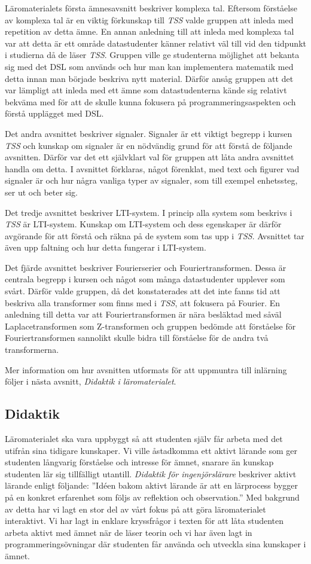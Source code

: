\documentclass[]{article}
\begin{document}
Läromaterialets första ämnesavsnitt beskriver komplexa tal. Eftersom förståelse av komplexa tal är en viktig förkunskap
till \textit{TSS} valde gruppen att inleda med repetition av detta ämne. En annan anledning till att inleda med komplexa
tal var att detta är ett område datastudenter känner relativt väl till vid den tidpunkt i studierna då de läser
\textit{TSS}. Gruppen ville ge studenterna möjlighet att bekanta sig med det DSL som används och hur man kan
implementera matematik med detta innan man började beskriva nytt material. Därför ansåg gruppen att det var lämpligt att
inleda med ett ämne som datastudenterna kände sig relativt bekväma med för att de skulle kunna fokusera på
programmeringsaspekten och förstå upplägget med DSL.

Det andra avsnittet beskriver signaler. Signaler är ett viktigt begrepp i kursen \textit{TSS} och kunskap om signaler är
en nödvändig grund för att förstå de följande avsnitten. Därför var det ett självklart val för gruppen att låta andra
avsnittet handla om detta. I avsnittet förklaras, något förenklat, med text och figurer vad signaler är och hur några
vanliga typer av signaler, som till exempel enhetssteg, ser ut och beter sig.

Det tredje avsnittet beskriver LTI-system. I princip alla system som beskrivs i \textit{TSS} är LTI-system. Kunskap om LTI-system
och dess egenskaper är därför avgörande för att förstå och räkna på de system som tas upp i \textit{TSS}. Avsnittet tar
även upp faltning och hur detta fungerar i LTI-system.

Det fjärde avsnittet beskriver Fourierserier och Fouriertransformen. Dessa är centrala begrepp i kursen och något som
många datastudenter upplever som svårt. Därför valde gruppen, då det konstaterades att det inte fanns tid att beskriva
alla transformer som finns med i \textit{TSS}, att fokusera på Fourier. En anledning till detta var att Fouriertransformen är nära besläktad med
såväl Laplacetransformen som Z-transformen och gruppen bedömde att förståelse för Fouriertransformen sannolikt skulle
bidra till förståelse för de andra två transformerna.

Mer information om hur avsnitten utformats för att uppmuntra till inlärning följer i nästa avsnitt,
\textit{Didaktik i läromaterialet}.

\subsection{Didaktik}
Läromaterialet ska vara uppbyggt så att studenten själv får arbeta med det utifrån sina tidigare
kunskaper. Vi ville åstadkomma ett aktivt lärande som ger studenten långvarig förståelse och
intresse för ämnet, snarare än kunskap studenten lär sig tillfälligt utantill. \textit{Didaktik för
ingenjörslärare} beskriver aktivt lärande enligt följande: ”Idéen bakom aktivt lärande är att en
lärprocess bygger på en konkret erfarenhet som följs av reflektion och observation.” Med bakgrund av
detta har vi lagt en stor del av vårt fokus på att göra läromaterialet interaktivt. Vi har lagt in
enklare kryssfrågor i texten för att låta studenten arbeta aktivt med ämnet när de läser teorin och
vi har även lagt in programmeringsövningar där studenten får använda och utveckla sina kunskaper i
ämnet.
\end{document}
